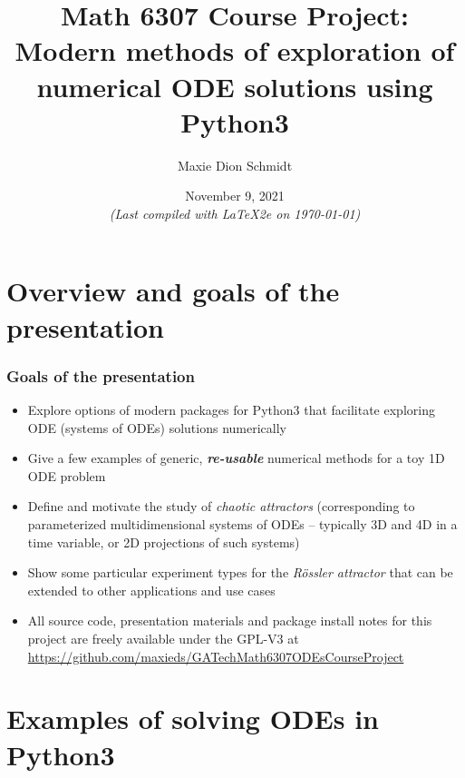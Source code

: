 \documentclass[usenames,svgnames,dvipsnames,10pt]{beamer}
\title[Math 6307 Course Project]{
     Math 6307 Course Project: \\ Modern methods of exploration of numerical ODE solutions using Python3 
}
\author{Maxie Dion Schmidt} %
\institute[GA Tech] 
{
Georgia Institute of Technology \\ 
School of Mathematics \\ %
\medskip
\textit{maxieds@gmail.com} \\ 
\textit{mschmidt34@gatech.edu} \\ 
\medskip 
\url{http://people.math.gatech.edu/~mschmidt34/} \\ 
\url{https://github.com/maxieds/GATechMath6307ODEsCourseProject}
}
\date[November 9, 2021]{November 9, 2021 \\ {\small{\it (Last compiled with \LaTeX2e on \today)}}} %
\begin{document}
\begin{frame}
\titlepage %
\end{frame} 



\section{Overview and goals of the presentation} 

\begin{frame}
     \frametitle{Goals of the presentation}

\begin{itemize} 

     \item Explore options of modern packages for Python3 that facilitate exploring ODE (systems of ODEs) solutions numerically 
     \item Give a few examples of generic, \emph{\textbf{re-usable}} numerical methods for a toy 1D ODE problem
     \item Define and motivate the study of \emph{chaotic attractors} (corresponding to parameterized multidimensional systems of ODEs -- 
           typically 3D and 4D in a time variable, or 2D projections of such systems) 
     \item Show some particular experiment types for the \emph{R\"ossler attractor} that can be extended to other applications and use cases
     \item All source code, presentation materials and package install notes 
           for this project are freely available under the GPL-V3 at \\ 
           {\small{\url{https://github.com/maxieds/GATechMath6307ODEsCourseProject}}}

\end{itemize} 

\end{frame}

\section{Examples of solving ODEs in Python3}
\end{document}
